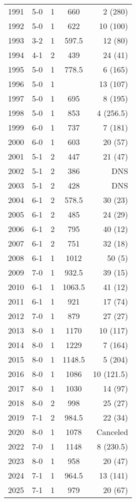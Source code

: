 \begin{longtable}{lcccr}
1991 & 5-0 & 1 & 660 & 2 (280) \\
1992 & 5-0 & 1 & 622 & 10 (100) \\
1993 & 3-2 & 1 & 597.5 & 12 (80) \\
1994 & 4-1 & 2 & 439 & 24 (41) \\
1995 & 5-0 & 1 & 778.5 & 6 (165) \\
1996 & 5-0 & 1 &   & 13 (107) \\
1997 & 5-0 & 1 & 695 & 8 (195) \\
1998 & 5-0 & 1 & 853 & 4 (256.5) \\
1999 & 6-0 & 1 & 737 & 7 (181) \\
2000 & 6-0 & 1 & 603 & 20 (57) \\
2001 & 5-1 & 2 & 447 & 21 (47) \\
2002 & 5-1 & 2 & 386 & DNS \\
2003 & 5-1 & 2 & 428 & DNS \\
2004 & 6-1 & 2 & 578.5 & 30 (23) \\
2005 & 6-1 & 2 & 485 & 24 (29) \\
2006 & 6-1 & 2 & 795 & 40 (12) \\
2007 & 6-1 & 2 & 751 & 32 (18) \\
2008 & 6-1 & 1 & 1012 & 50 (5) \\
2009 & 7-0 & 1 & 932.5 & 39 (15) \\
2010 & 6-1 & 1 & 1063.5 & 41 (12) \\
2011 & 6-1 & 1 & 921 & 17 (74) \\
2012 & 7-0 & 1 & 879 & 27 (27) \\
2013 & 8-0 & 1 & 1170 & 10 (117) \\
2014 & 8-0 & 1 & 1229 & 7 (164) \\
2015 & 8-0 & 1 & 1148.5 & 5 (204) \\
2016 & 8-0 & 1 & 1086 & 10 (121.5) \\
2017 & 8-0 & 1 & 1030 & 14 (97) \\
2018 & 8-0 & 2 & 998 & 25 (27) \\
2019 & 7-1 & 2 & 984.5 & 22 (34) \\
2020 & 8-0 & 1 & 1078 & Canceled \\
2022 & 7-0 & 1 & 1148 & 8 (230.5) \\
2023 & 8-0 & 1 & 958 & 20 (47) \\
2024 & 7-1 & 1 & 964.5 & 13 (141) \\
2025 & 7-1 & 1 & 979 & 20 (67) \\
\bottomrule
\end{longtable}

